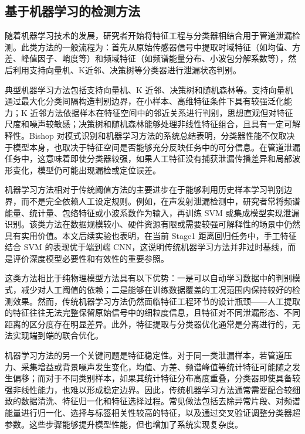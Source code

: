 \subsection{基于机器学习的检测方法}

随着机器学习技术的发展，研究者开始将特征工程与分类器相结合用于管道泄漏检测\cite{chen2020svm}。此类方法的一般流程为：首先从原始传感器信号中提取时域特征（如均值、方差、峰值因子、峭度等）和频域特征（如频谱能量分布、小波包分解系数等），然后利用支持向量机、K近邻、决策树等分类器进行泄漏状态判别\cite{zhou2016MLbook}。

典型机器学习方法包括支持向量机、K 近邻、决策树和随机森林等。支持向量机通过最大化分类间隔构造判别边界，在小样本、高维特征条件下具有较强泛化能力\cite{cortes1995svm}；K 近邻方法依据样本在特征空间中的邻近关系进行判别，思想直观但对特征尺度和噪声较敏感\cite{cover1967knn}；决策树和随机森林能够处理非线性特征组合，且具有一定可解释性\cite{breiman1984cart,breiman2001random}。Bishop 对模式识别和机器学习方法的系统总结表明，分类器性能不仅取决于模型本身，也取决于特征空间是否能够充分反映任务中的可分信息\cite{bishop2006prml}。在管道泄漏任务中，这意味着即使分类器较强，如果人工特征没有捕获泄漏传播差异和局部波形变化，模型仍可能出现漏检或定位误差。

机器学习方法相对于传统阈值方法的主要进步在于能够利用历史样本学习判别边界，而不是完全依赖人工设定规则。例如，在声发射泄漏检测中，研究者常将频谱能量、统计量、包络特征或小波系数作为输入，再训练 SVM 或集成模型实现泄漏识别。该类方法在数据规模较小、硬件资源有限或需要较强可解释性的场景中仍然具有实用价值。本文后续实验也表明，在当前 Stage1 距离回归任务中，手工特征结合 SVM 的表现优于端到端 CNN，这说明传统机器学习方法并非过时基线，而是评价深度模型必要性和有效性的重要参照。

这类方法相比于纯物理模型方法具有以下优势：一是可以自动学习数据中的判别模式，减少对人工阈值的依赖；二是能够在训练数据覆盖的工况范围内保持较好的检测效果。然而，传统机器学习方法仍然面临特征工程环节的设计瓶颈——人工提取的特征往往无法完整保留原始信号中的细粒度信息，且特征对不同泄漏形态、不同距离的区分度存在明显差异\cite{wang2022deep}。此外，特征提取与分类器优化通常是分离进行的，无法实现端到端的联合优化。

机器学习方法的另一个关键问题是特征稳定性。对于同一类泄漏样本，若管道压力、采集增益或背景噪声发生变化，均值、方差、频谱峰值等统计特征可能随之发生偏移；而对于不同类别样本，如果其统计特征分布高度重叠，分类器即使具备较强非线性能力，也难以形成稳定边界。因此，传统机器学习方法通常需要配合较细致的数据清洗、特征归一化和特征选择过程。常见做法包括去除异常片段、对频谱能量进行归一化、选择与标签相关性较高的特征，以及通过交叉验证调整分类器超参数。这些步骤能够提升模型性能，但也增加了系统实现复杂度。

